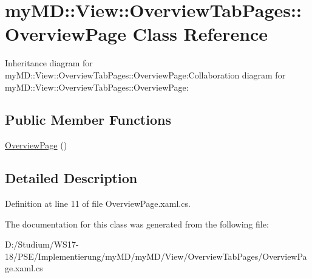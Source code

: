 \hypertarget{classmy_m_d_1_1_view_1_1_overview_tab_pages_1_1_overview_page}{
\section{my\-MD::View::Overview\-Tab\-Pages::Overview\-Page Class Reference}
\label{d4/df4/classmy_m_d_1_1_view_1_1_overview_tab_pages_1_1_overview_page}
}
Inheritance diagram for my\-MD::View::Overview\-Tab\-Pages::Overview\-Page:Collaboration diagram for my\-MD::View::Overview\-Tab\-Pages::Overview\-Page:\subsection*{Public Member Functions}
\begin{CompactItemize}
\item 
\hypertarget{classmy_m_d_1_1_view_1_1_overview_tab_pages_1_1_overview_page_7af26d564b7a46596dedf26a5d8b3c41}{
\hyperlink{classmy_m_d_1_1_view_1_1_overview_tab_pages_1_1_overview_page_7af26d564b7a46596dedf26a5d8b3c41}{Overview\-Page} ()}
\label{d4/df4/classmy_m_d_1_1_view_1_1_overview_tab_pages_1_1_overview_page_7af26d564b7a46596dedf26a5d8b3c41}

\end{CompactItemize}


\subsection{Detailed Description}




Definition at line 11 of file Overview\-Page.xaml.cs.

The documentation for this class was generated from the following file:\begin{CompactItemize}
\item 
D:/Studium/WS17-18/PSE/Implementierung/my\-MD/my\-MD/View/Overview\-Tab\-Pages/Overview\-Page.xaml.cs\end{CompactItemize}
